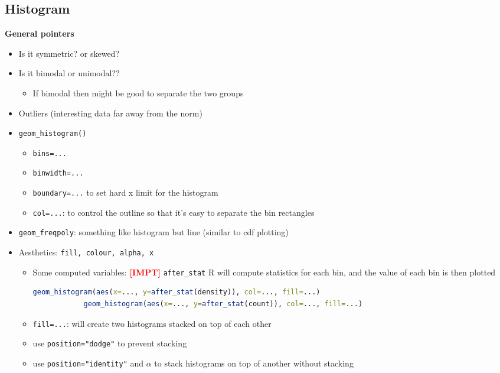 \documentclass{article}
\newcommand{\impt}[0]{\textcolor{red}{\textbf{[IMPT] }}}
\begin{document}
\begin{multicols}{2}
\subsection{Histogram}
\textbf{General pointers}
\begin{itemize}
	\item Is it symmetric? or skewed?
	\item Is it bimodal or unimodal??
	\begin{itemize}
		\item If bimodal then might be good to separate the two groups
	\end{itemize}
    \item Outliers (interesting data far away from the norm)
\end{itemize}
\begin{itemize}
	\item \texttt{geom\_histogram()}
	\begin{itemize}
		\item \texttt{bins=...}
		\item \texttt{binwidth=...}
		\item \texttt{boundary=...} to set hard x limit for the histogram
		\item \texttt{col=...}: to control the outline so that it's easy to separate the bin rectangles
	\end{itemize}
	\item \texttt{geom\_freqpoly}: something like histogram but line (similar to cdf plotting)
	\item Aesthetics: \texttt{fill, colour, alpha, x}
	\begin{itemize}
		\item Some computed variables: \impt \texttt{after\_stat} R will compute statistics for each bin, and the value of each bin is then plotted
		\begin{lstlisting}[language=R]
			geom_histogram(aes(x=..., y=after_stat(density)), col=..., fill=...)
			geom_histogram(aes(x=..., y=after_stat(count)), col=..., fill=...)\end{lstlisting}
		\item \texttt{fill=...}: will create two histograms stacked on top of each other
		\item use \texttt{position="dodge"} to prevent stacking
		\item use \texttt{position="identity"} and $\alpha$ to stack histograms on top of another without stacking

	\end{itemize}
\end{itemize}


\end{multicols}
\end{document}
